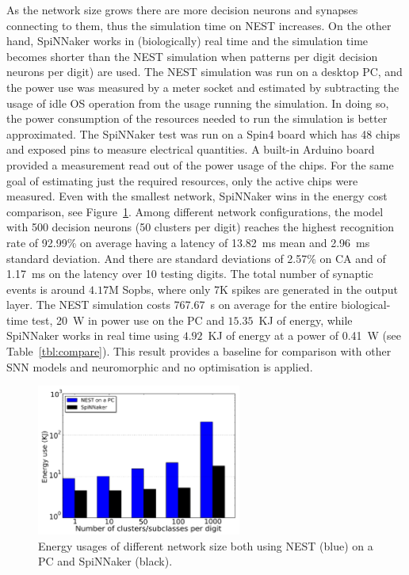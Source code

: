 As the network size grows there are more decision neurons and synapses connecting to them, thus the simulation time on NEST increases.
On the other hand, SpiNNaker works in (biologically) real time and the simulation time becomes shorter than the NEST simulation when \protect{} \protect{} patterns per digit \protect{} \protect{} decision neurons per digit) are used.
The NEST simulation was run on a desktop PC, and the power use was measured by a meter socket and estimated by subtracting the usage of idle OS operation from the usage running the simulation.
In doing so, the power consumption of the resources needed to run the simulation is better approximated.
The SpiNNaker test was run on a Spin4 board which has 48 chips and exposed pins to measure electrical quantities.
A built-in Arduino board provided a measurement read out of the power usage of the chips.
For the same goal of estimating just the required resources, only the active chips were measured.
Even with the smallest network, SpiNNaker wins in the energy cost comparison, see Figure~\ref{fig:energy}.
Among different network configurations, the model with 500 decision neurons (50 clusters per digit) reaches the highest recognition rate of 92.99\% on average having a latency of 13.82~ms mean and 2.96~ms standard deviation.
And there are standard deviations of 2.57\% on CA and of 1.17~ms on the latency over 10 testing digits.
The total number of synaptic events is around $4.17$M Sopbs, where only 7K spikes are generated in the output layer. 
The NEST simulation costs 767.67~s on average for the entire \protect{} \protect{} biological-time test, 20~W in power use on the PC and $15.35$~KJ of energy, while SpiNNaker works in real time using $4.92$~KJ of energy at a power of 0.41~W (see Table~\ref{tbl:compare}).
This result provides a baseline for comparison with other SNN models and neuromorphic \protect{} \protect{} and no optimisation is applied.


\begin{figure}[hbt!]
	\centering
	\includegraphics[width=0.6\textwidth]{pics_bench/fig8.jpg}
	\caption{Energy usages of different network size both using NEST (blue) on a PC and SpiNNaker (black).}
	\label{fig:energy}
\end{figure}

